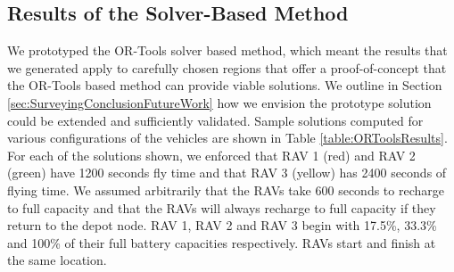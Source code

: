 \subsection{Results of the Solver-Based Method}
We prototyped the OR-Tools solver based method, which meant the results that we generated apply to carefully chosen regions that offer a proof-of-concept that the OR-Tools based method can provide viable solutions. We outline in Section \ref{sec:SurveyingConclusionFutureWork} how we envision the prototype solution could be extended and sufficiently validated. Sample solutions computed for various configurations of the vehicles are shown in Table \ref{table:ORToolsResults}. For each of the solutions shown, we enforced that RAV 1 (red) and RAV 2 (green) have 1200 seconds fly time and that RAV 3 (yellow) has 2400 seconds of flying time. We assumed arbitrarily that the RAVs take 600 seconds to recharge to full capacity and that the RAVs will always recharge to full capacity if they return to the depot node. RAV 1, RAV 2 and RAV 3 begin with 17.5\%, 33.3\% and 100\% of their full battery capacities respectively. RAVs start and finish at the same location.

